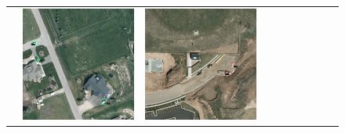 \begin{figure}[h!]
\begin{tabularx}{\textwidth}{c|*{9}{X}}
    & \includegraphics[trim={230pt 200pt 680pt 725pt},clip,width=\linewidth]{images/015Results/01abb_vs_obb/comp_images/aab_old/509.png}
    & \includegraphics[trim={440pt 360pt 460pt 555pt},clip,width=\linewidth]{images/015Results/01abb_vs_obb/comp_images/aab_old/427.png}

\end{tabularx}
\end{figure}
